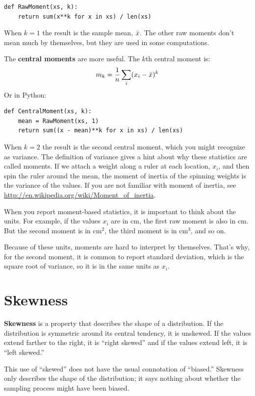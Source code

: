 \documentclass[12pt]{book}
\begin{document}
\begin{verbatim}
def RawMoment(xs, k):
    return sum(x**k for x in xs) / len(xs)
\end{verbatim}

When $k=1$ the result is the sample mean, $\bar{x}$.  The other
raw moments don't mean much by themselves, but they are used
in some computations.

The {\bf central moments} are more useful.  The
$k$th central moment is:
%
\[ m_k = \frac{1}{n} \sum_i (x_i - \bar{x})^k \]
%
Or in Python:

\begin{verbatim}
def CentralMoment(xs, k):
    mean = RawMoment(xs, 1)
    return sum((x - mean)**k for x in xs) / len(xs)
\end{verbatim}

When $k=2$ the result is the second central moment, which you might
recognize as variance.  The definition of variance gives a hint about
why these statistics are called moments.  If we attach a weight along a
ruler at each location, $x_i$, and then spin the ruler around
the mean, the moment of inertia of the spinning weights is the variance
of the values.  If you are not familiar with moment of inertia, see
\url{http://en.wikipedia.org/wiki/Moment_of_inertia}.  

When you report moment-based statistics, it is important to think
about the units.  For example, if the values $x_i$ are in cm, the
first raw moment is also in cm.  But the second moment is in
cm$^2$, the third moment is in cm$^3$, and so on.

Because of these units, moments are hard to interpret by themselves.
That's why, for the second moment, it is common to report standard
deviation, which is the square root of variance, so it is in the same
units as $x_i$.


\section{Skewness}

{\bf Skewness} is a property that describes the shape of a distribution.
If the distribution is symmetric around its central tendency, it is
unskewed.  If the values extend farther to the right, it is ``right
skewed'' and if the values extend left, it is ``left skewed.''

This use of ``skewed'' does not have the usual connotation of
``biased.''  Skewness only describes the shape of the distribution;
it says nothing about whether the sampling process might have been
biased.
\end{document}
